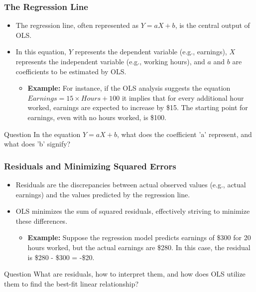 \documentclass[notes,10pt, aspectratio=169]{beamer}
\begin{document}
\begin{frame}
\frametitle{The Regression Line}

\begin{itemize}
    \item  The regression line, often represented as $Y = aX + b$, is the central output of OLS.\vspace{1em}
    \item In this equation, $Y$ represents the dependent variable (e.g., earnings), $X$ represents the independent variable (e.g., working hours), and $a$ and $b$ are coefficients to be estimated by OLS.\vspace{1em}
    \begin{itemize}
        \item \textbf{Example:} For instance, if the OLS analysis suggests the equation $Earnings = 15 \times Hours + 100$ it implies that for every additional hour worked, earnings are expected to increase by \$15. The starting point for earnings, even with no hours worked, is \$100.
    \end{itemize}
\end{itemize}

\begin{exampleblock}{Question}
In the equation $Y = aX + b$, what does the coefficient 'a' represent, and what does 'b' signify?
\end{exampleblock}

\end{frame}

\begin{frame}
\frametitle{Residuals and Minimizing Squared Errors}

\begin{itemize}
    \item  Residuals are the discrepancies between actual observed values (e.g., actual earnings) and the values predicted by the regression line.\vspace{1em}
    \item OLS minimizes the sum of squared residuals, effectively striving to minimize these differences.\vspace{1em}
    \begin{itemize}
        \item \textbf{Example:} Suppose the regression model predicts earnings of \$300 for 20 hours worked, but the actual earnings are \$280. In this case, the residual is \$280 - \$300 = -\$20.
    \end{itemize}
\end{itemize}

\begin{exampleblock}{Question}
What are residuals, how to interpret them, and how does OLS utilize them to find the best-fit linear relationship?
\end{exampleblock}

\end{frame}
\end{document}
